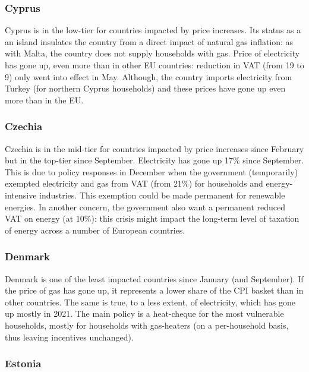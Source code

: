 \documentclass[
  9pt,
  a4paper,
  DIV=11,
  numbers=noendperiod,
  oneside]{scrartcl}
\begin{document}
\hypertarget{cyprus}{%
\subsubsection{Cyprus}\label{cyprus}}

Cyprus is in the low-tier for countries impacted by price increases. Its
status as a an island insulates the country from a direct impact of
natural gas inflation: as with Malta, the country does not supply
households with gas. Price of electricity has gone up, even more than in
other EU countries: reduction in VAT (from 19 to 9) only went into
effect in May. Although, the country imports electricity from Turkey
(for northern Cyprus households) and these prices have gone up even more
than in the EU.

\hypertarget{czechia}{%
\subsubsection{Czechia}\label{czechia}}

Czechia is in the mid-tier for countries impacted by price increases
since February but in the top-tier since September. Electricity has gone
up 17\% since September. This is due to policy responses in December
when the government (temporarily) exempted electricity and gas from VAT
(from 21\%) for households and energy-intensive industries. This
exemption could be made permanent for renewable energies. In another
concern, the government also want a permanent reduced VAT on energy (at
10\%): this crisis might impact the long-term level of taxation of
energy across a number of European countries.

\hypertarget{denmark}{%
\subsubsection{Denmark}\label{denmark}}

Denmark is one of the least impacted countries since January (and
September). If the price of gas has gone up, it represents a lower share
of the CPI basket than in other countries. The same is true, to a less
extent, of electricity, which has gone up mostly in 2021. The main
policy is a heat-cheque for the most vulnerable households, mostly for
households with gas-heaters (on a per-household basis, thus leaving
incentives unchanged).

\hypertarget{estonia}{%
\subsubsection{Estonia}\label{estonia}}
\end{document}
